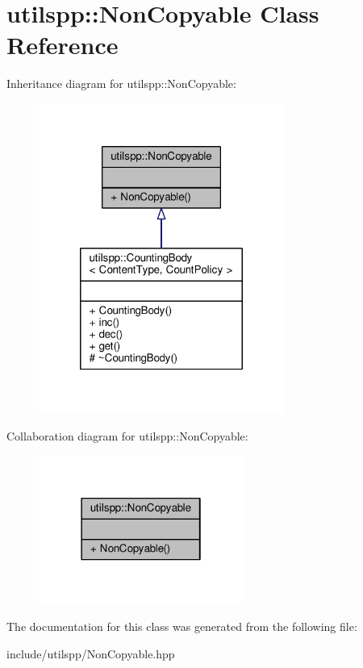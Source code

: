 \hypertarget{classutilspp_1_1NonCopyable}{\section{utilspp\-:\-:Non\-Copyable Class Reference}
\label{classutilspp_1_1NonCopyable}
}


Inheritance diagram for utilspp\-:\-:Non\-Copyable\-:
\nopagebreak
\begin{figure}[H]
\begin{center}
\leavevmode
\includegraphics[width=228pt]{classutilspp_1_1NonCopyable__inherit__graph}
\end{center}
\end{figure}


Collaboration diagram for utilspp\-:\-:Non\-Copyable\-:
\nopagebreak
\begin{figure}[H]
\begin{center}
\leavevmode
\includegraphics[width=190pt]{classutilspp_1_1NonCopyable__coll__graph}
\end{center}
\end{figure}


The documentation for this class was generated from the following file\-:\begin{DoxyCompactItemize}
\item 
include/utilspp/Non\-Copyable.\-hpp\end{DoxyCompactItemize}
